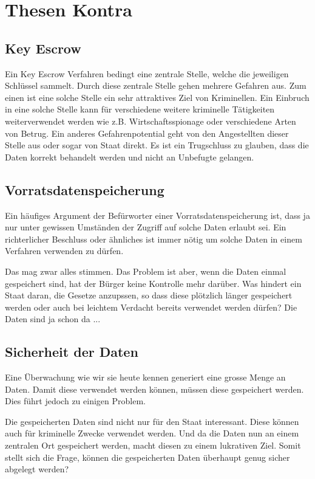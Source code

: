 \documentclass[10pt,a4paper]{article}
\begin{document}
\section*{Thesen Kontra}

\subsection*{Key Escrow}
Ein Key Escrow Verfahren bedingt eine zentrale Stelle, welche die jeweiligen
Schlüssel sammelt.
Durch diese zentrale Stelle gehen mehrere Gefahren aus. Zum einen ist eine
solche Stelle ein sehr attraktives Ziel von Kriminellen. Ein Einbruch in eine
solche Stelle kann für verschiedene weitere kriminelle Tätigkeiten
weiterverwendet werden wie z.B. Wirtschaftsspionage oder verschiedene Arten
von Betrug.
Ein anderes Gefahrenpotential geht von den Angestellten dieser Stelle aus oder
sogar von Staat direkt. Es ist ein Trugschluss zu glauben, dass die Daten
korrekt behandelt werden und nicht an Unbefugte gelangen.

\subsection*{Vorratsdatenspeicherung}
Ein häufiges Argument der Befürworter einer Vorratsdatenspeicherung ist, dass ja nur unter gewissen Umständen der Zugriff auf solche Daten erlaubt sei. Ein richterlicher Beschluss oder ähnliches ist immer nötig um solche Daten in einem Verfahren verwenden zu dürfen.

Das mag zwar alles stimmen. Das Problem ist aber, wenn die Daten einmal gespeichert sind, hat der Bürger keine Kontrolle mehr darüber. Was hindert ein Staat daran, die Gesetze anzupssen, so dass diese plötzlich länger gespeichert werden oder auch bei leichtem Verdacht bereits verwendet werden dürfen? Die Daten sind ja schon da ...

\subsection*{Sicherheit der Daten}
Eine Überwachung wie wir sie heute kennen generiert eine grosse Menge an Daten. Damit diese verwendet werden können, müssen diese gespeichert werden. Dies führt jedoch zu einigen Problem.

Die gespeicherten Daten sind nicht nur für den Staat interessant. Diese können auch für kriminelle Zwecke verwendet werden. Und da die Daten nun an einem zentralen Ort gespeichert werden, macht diesen zu einem lukrativen Ziel. Somit stellt sich die Frage, können die gespeicherten Daten überhaupt genug sicher abgelegt werden?
\end{document}

